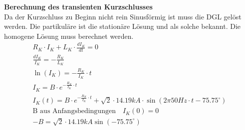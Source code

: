 \textbf{Berechnung des transienten Kurzschlusses}\\
Da der Kurzschluss zu Beginn nicht rein Sinusförmig ist muss die DGL gelöst werden. Die partikuläre ist die stationäre Lösung und als solche bekannt. Die homogene Lösung muss berechnet werden.
\[\begin{array}{c}
R_K\cdot I_K + L_K\cdot \frac{dI_K}{dt} = 0\\
\frac{dI_K}{I_K} = -\frac{R_K}{L_K}\\
\ln(I_K) = -\frac{R_K}{I_K}\cdot t\\
I_K = B\cdot e^{-\frac{R_K}{I_K}\cdot t}\\
I_K(t) = B\cdot e^{-\frac{R_K}{I_K}\cdot t}+ \sqrt{2}\cdot 14.19kA\cdot \sin(2\pi 50Hz\cdot t-75.75^\circ)\\
\textrm{B aus Anfangsbedingungen}\quad I_K(0)=0\\
-B = \sqrt{2}\cdot 14.19kA \sin(-75.75^\circ) 
\end{array}\]

